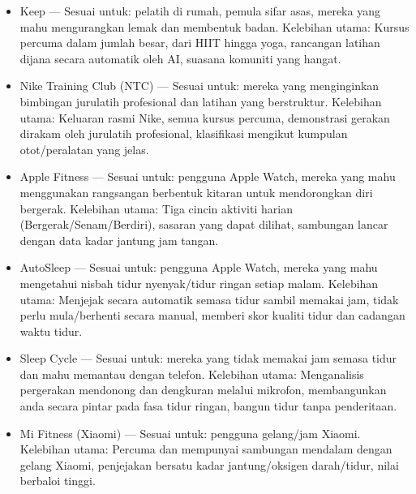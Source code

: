 \begin{itemize}
  \item Keep — Sesuai untuk: pelatih di rumah, pemula sifar asas, mereka yang mahu mengurangkan lemak dan membentuk badan. Kelebihan utama: Kursus percuma dalam jumlah besar, dari HIIT hingga yoga, rancangan latihan dijana secara automatik oleh AI, suasana komuniti yang hangat.
  \item Nike Training Club (NTC) — Sesuai untuk: mereka yang menginginkan bimbingan jurulatih profesional dan latihan yang berstruktur. Kelebihan utama: Keluaran rasmi Nike, semua kursus percuma, demonstrasi gerakan dirakam oleh jurulatih profesional, klasifikasi mengikut kumpulan otot/peralatan yang jelas.
  \item Apple Fitness — Sesuai untuk: pengguna Apple Watch, mereka yang mahu menggunakan rangsangan berbentuk kitaran untuk mendorongkan diri bergerak. Kelebihan utama: Tiga cincin aktiviti harian (Bergerak/Senam/Berdiri), sasaran yang dapat dilihat, sambungan lancar dengan data kadar jantung jam tangan.
\end{itemize}


\begin{itemize}
  \item AutoSleep — Sesuai untuk: pengguna Apple Watch, mereka yang mahu mengetahui nisbah tidur nyenyak/tidur ringan setiap malam. Kelebihan utama: Menjejak secara automatik semasa tidur sambil memakai jam, tidak perlu mula/berhenti secara manual, memberi skor kualiti tidur dan cadangan waktu tidur.
  \item Sleep Cycle — Sesuai untuk: mereka yang tidak memakai jam semasa tidur dan mahu memantau dengan telefon. Kelebihan utama: Menganalisis pergerakan mendonong dan dengkuran melalui mikrofon, membangunkan anda secara pintar pada fasa tidur ringan, bangun tidur tanpa penderitaan.
  \item Mi Fitness (Xiaomi) — Sesuai untuk: pengguna gelang/jam Xiaomi. Kelebihan utama: Percuma dan mempunyai sambungan mendalam dengan gelang Xiaomi, penjejakan bersatu kadar jantung/oksigen darah/tidur, nilai berbaloi tinggi.
\end{itemize}


